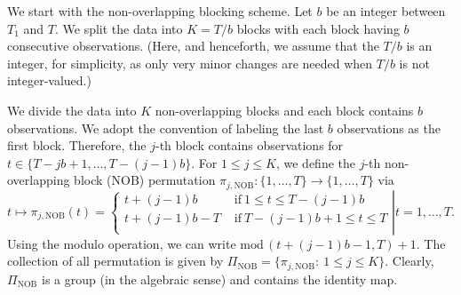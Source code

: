 \documentclass[final,12pt]{colt2018} %
\begin{document}



We start with the non-overlapping blocking scheme. Let $b$ be an integer between $T_1$ and $T$.  We split the data into $K=T/b$ blocks with each block having $b$ consecutive observations. (Here, and henceforth, we assume that the $T/b$ is an integer, for simplicity, as only very minor changes are needed when $T/b$ is not integer-valued.)  

We divide the data into $K$  non-overlapping blocks and each block contains $b$ observations.
We adopt the convention of labeling the last $b$ observations as the first block. Therefore, the $j$-th block contains observations for $t\in \{ T-jb+1,\dots,T-(j-1)b \}  $. For $1\leq j\leq K$, we define the $j$-th non-overlapping block (NOB) permutation $\pi_{j,\text{NOB}}: \{1,\dots,T\} \rightarrow \{1,\dots,T\} $ via 
\begin{equation} \label{eq: non-overlapping permutation}
t \mapsto \pi_{j,\text{NOB}}(t)= \left . \begin{cases}
t+(j-1)b & \text{ if}\ 1\le t\le T-(j-1)b\\
t+(j-1)b-T &  \text{ if}\ T-(j-1)b+1\le t \le T\\
\end{cases} \right | t = 1,\dots,T.
\end{equation}
Using the modulo operation, we can write $\text{mod}\,(t+(j-1)b-1,T)+1 $.
The collection of all permutation is given by $\Pi_{\text{NOB}}=\{\pi_{j,\text{NOB}}:\ 1\leq j\leq K\} $. Clearly, $\Pi_{\text{NOB}}$ is a group (in the algebraic sense) and contains the identity map. 
\end{document}
